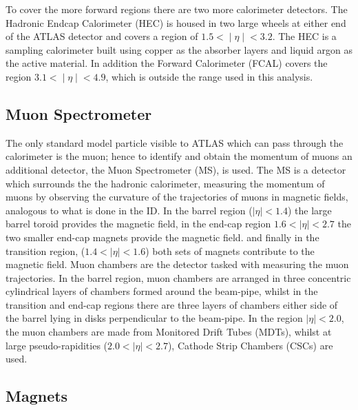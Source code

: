 To cover the more forward regions there are two more calorimeter detectors.
The Hadronic Endcap Calorimeter (HEC) is housed in two large wheels at either end of the ATLAS detector
and covers a region of $1.5 < ∣\eta∣ < 3.2$.
The HEC is a sampling calorimeter built using copper as the absorber layers and liquid argon as the active material.
In addition the Forward Calorimeter (FCAL) covers the region $3.1 < ∣\eta∣ < 4.9$, which is outside the range used in this analysis.

\subsection{Muon Spectrometer}

The only standard model particle visible to ATLAS which can pass through the calorimeter is the muon;
hence to identify and obtain the momentum of muons an additional detector, the Muon Spectrometer (MS), is used.
The MS is a detector which surrounds the the hadronic calorimeter,
measuring the momentum of muons by observing the curvature of the trajectories of muons in magnetic fields,
analogous to what is done in the ID.
In the barrel region ($|\eta| < 1.4$) the large barrel toroid provides the magnetic field,
in the end-cap region $1.6 < |\eta| < 2.7$ the two smaller end-cap magnets  provide the magnetic field.
and finally in the transition region, ($1.4 < |\eta| < 1.6$) both sets of magnets contribute to the magnetic field.
Muon chambers are the detector tasked with measuring the muon trajectories.
In the barrel region, muon chambers are arranged in three concentric cylindrical layers of chambers formed around the beam-pipe,
whilst in the transition and end-cap regions there are three layers of chambers either side of the barrel lying in disks perpendicular to the beam-pipe.
In the region $|\eta| < 2.0$, the muon chambers are made from Monitored Drift Tubes (MDTs),
whilst at large pseudo-rapidities ($2.0 < |\eta| < 2.7$), Cathode Strip Chambers (CSCs) are used. \\

\subsection{Magnets}

